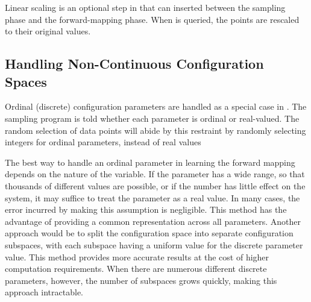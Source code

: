 Linear scaling is an optional step in \fw that can inserted between the sampling phase and the forward-mapping phase.
When \fw is queried, the points are rescaled to their original values.



\subsection{Handling Non-Continuous Configuration Spaces}

Ordinal (discrete) configuration parameters are handled as a special case in \fw.
The sampling program is told whether each parameter is ordinal or real-valued.
The random selection of data points will abide by this restraint by randomly selecting integers for ordinal parameters, instead of real values

The best way to handle an ordinal parameter in learning the forward mapping depends on the nature of the variable.
If the parameter has a wide range, so that thousands of different values are possible, or if the number has little effect on the system, it may suffice to treat the parameter as a real value.
In many cases, the error incurred by making this assumption is negligible.
This method has the advantage of providing a common representation across all parameters.
Another approach would be to split the configuration space into separate configuration subspaces, with each subspace having a uniform value for the discrete parameter value.
This method provides more accurate results at the cost of higher computation requirements.
When there are numerous different discrete parameters, however, the number of subspaces grows quickly, making this approach intractable.



